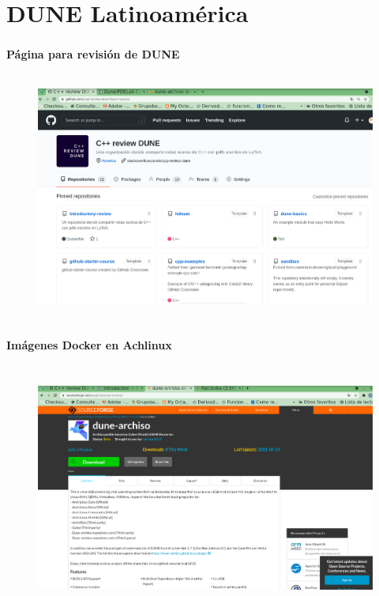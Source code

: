 \section{DUNE Latinoamérica}
\begin{frame}
	\frametitle{\secname}
	\framesubtitle{Página para revisión de DUNE}
	\begin{figure}[ht!]
		\centering
		\includegraphics[height=8cm, width=12cm]{cpp_review}
	\end{figure}

\end{frame}
\begin{frame}
	\frametitle{\secname}
	\framesubtitle{Imágenes Docker en Achlinux}
	\begin{figure}[ht!]
		\centering
		\includegraphics[height=8cm, width=12cm]{archiso}
	\end{figure}
\end{frame}


